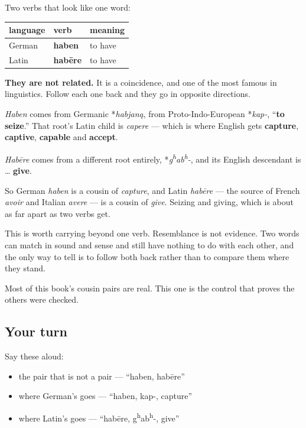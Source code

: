 \begin{cousinweb}
Two verbs that look like one word:

\noindent
\begin{tabularx}{\linewidth}{@{}>{\raggedright\arraybackslash}X>{\raggedright\arraybackslash}X>{\raggedright\arraybackslash}X@{}}
\toprule
\textbf{language} & \textbf{verb} & \textbf{meaning} \\
\midrule
German & \textbf{haben} & to have \\
Latin & \textbf{habēre} & to have \\
\bottomrule
\end{tabularx}

\textbf{They are not related.} It is a coincidence, and one of the most famous in linguistics. Follow each one back and they go in opposite directions.

\emph{Haben} comes from Germanic *\emph{habjaną}, from Proto-Indo-European *\emph{kap-}, \textquotedblleft{}\textbf{to seize}.\textquotedblright{} That root's Latin child is \emph{capere} — which is where English gets \textbf{capture}, \textbf{captive}, \textbf{capable} and \textbf{accept}.

\emph{Habēre} comes from a different root entirely, *\emph{g\textsuperscript{h}ab\textsuperscript{h}-}, and its English descendant is … \textbf{give}.

So German \emph{haben} is a cousin of \emph{capture}, and Latin \emph{habēre} — the source of French \emph{avoir} and Italian \emph{avere} — is a cousin of \emph{give}. Seizing and giving, which is about as far apart as two verbs get.
\end{cousinweb}

\begin{culture}
This is worth carrying beyond one verb. Resemblance is not evidence. Two words can match in sound and sense and still have nothing to do with each other, and the only way to tell is to follow both back rather than to compare them where they stand.

Most of this book's cousin pairs are real. This one is the control that proves the others were checked.
\end{culture}

\subsection*{Your turn}
Say these aloud:

\begin{itemize}
\raggedright
  \item the pair that is not a pair — \textquotedblleft{}haben, habēre\textquotedblright{}
  \item where German's goes — \textquotedblleft{}haben, kap-, capture\textquotedblright{}
  \item where Latin's goes — \textquotedblleft{}habēre, g\textsuperscript{h}ab\textsuperscript{h}-, give\textquotedblright{}
\end{itemize}

